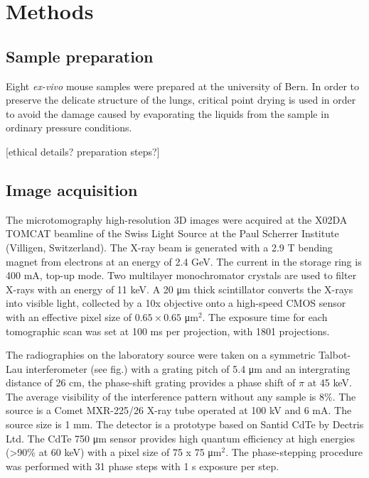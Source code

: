 \section{Methods}\label{sec:methods}
\subsection{Sample preparation}
Eight \emph{ex-vivo} mouse samples were prepared at the university of Bern.
In order to preserve the delicate structure of the lungs, critical point
drying is used in order to avoid the damage caused by evaporating the liquids
from the sample in ordinary pressure conditions.

[ethical details? preparation steps?]

\subsection{Image acquisition}\label{sec:acquisition}
The microtomography high-resolution 3D images were acquired at the X02DA
TOMCAT beamline of the Swiss Light Source at the Paul Scherrer Institute
(Villigen, Switzerland). The X-ray beam is generated with a 2.9 T bending
magnet from electrons at an energy of 2.4 GeV. The current in the storage
ring is 400 mA, top-up mode. Two multilayer monochromator crystals are used
to filter X-rays with an energy of 11 keV. A 20 μm thick scintillator
converts the X-rays into visible light, collected by a 10x objective onto a
high-speed CMOS sensor with an effective pixel size of $0.65 \times 0.65$
μm$^2$. The exposure time for each tomographic scan was set at 100 ms per
projection, with 1801 projections.

The radiographies on the laboratory source were taken on a symmetric
Talbot-Lau interferometer (see fig.) with a grating pitch of 5.4 μm and an intergrating
distance of 26 cm, the phase-shift grating provides a phase shift of $\pi$
at 45 keV. The average visibility of the interference pattern without any
sample is 8\%. The source is a Comet MXR-225/26 X-ray tube operated at 100
kV and 6 mA. The source size is 1 mm. The detector is a prototype based on
Santid CdTe by Dectris Ltd. The CdTe 750 μm sensor provides high quantum
efficiency at high energies (>90\% at 60 keV) with a pixel size of 75 x 75
μm$^2$. The phase-stepping procedure was performed with 31 phase steps with
1 s exposure per step.
